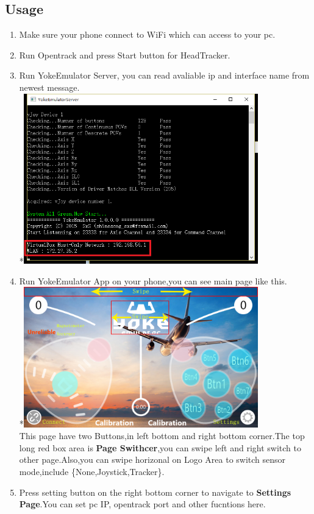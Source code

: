 \documentclass[12pt,a4paper]{article}
\begin{document}
\begin{CJK}{UTF8}{gbsn}
\section{Usage}
\begin{enumerate}
\item Make sure your phone connect to WiFi which can access to your pc.
\item Run Opentrack and press Start button for HeadTracker.
\item Run YokeEmulator Server, you can read avaliable ip and interface name from newest message.
\\*\includegraphics[width=4in]{usage_runserver.png}
\item Run YokeEmulator App on your phone,you can see main page like this.
\\*\includegraphics[width=4in]{usage_controlArea.png}
\\This page have two Buttons,in left bottom and right bottom corner.The top long red box area is \textbf{Page Swithcer},you can swipe left and right switch to other page.Also,you can swipe horizonal on Logo Area to switch sensor mode,include \{None,Joystick,Tracker\}.
\item Press setting button on the right bottom corner to navigate to \textbf{Settings Page}.You can set pc IP, opentrack port and other fucntions here.

\end{enumerate}
\end{CJK}
\end{document}

